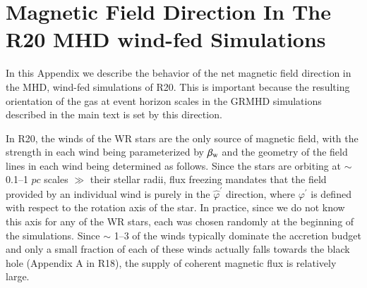 \documentclass[twocolumn,twocolappendix,apjl,appendixfloats]{aastex63}
\begin{document}
\section{Magnetic Field Direction In The R20 MHD wind-fed Simulations}
\label{app:B_dir}

In this Appendix we describe the behavior of the net magnetic field direction in the MHD, wind-fed simulations of R20.  This is important because the resulting orientation of the gas at event horizon scales in the GRMHD simulations described in the main text is set by this direction.  

In R20, the winds of the WR stars are the only source of magnetic field, with the strength in each wind being parameterized by $\beta_{\rm w}$ and the geometry of  the field lines in each wind being determined as follows. Since the stars are orbiting at $\sim$ 0.1--1 $pc$ scales $\gg$ their stellar radii, flux freezing mandates that the field provided by an individual wind is purely in the $\hat \varphi^\prime$ direction, where $\varphi^\prime$ is defined with respect to the rotation axis of the star.  In practice, since we do not know this axis for any of the WR stars, each was chosen randomly at the beginning of the simulations.  Since $\sim $ 1--3 of the winds typically dominate the accretion budget \citep{Cuadra2008} and only a small fraction of each of these winds actually falls towards the black hole (Appendix A in R18), the supply of coherent magnetic flux is relatively large.
\end{document}
